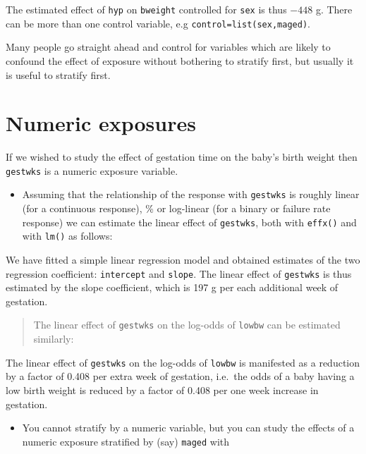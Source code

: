 \documentclass[
]{book}
\providecommand{\tightlist}{%
  \setlength{\itemsep}{0pt}\setlength{\parskip}{0pt}}
\begin{document}
The estimated effect of \texttt{hyp} on \texttt{bweight}
controlled for \texttt{sex} is thus \(-448\) g.
There can be more than one control variable, e.g
\texttt{control=list(sex,maged)}.

Many people go straight ahead and control for variables which are likely to confound the effect of exposure without bothering to stratify first, but usually it is useful to stratify first.

\section{Numeric exposures}\label{numeric-exposures}

If we wished to study the effect of gestation time on the baby's birth
weight then \texttt{gestwks} is a numeric exposure variable.

\begin{itemize}
\tightlist
\item
  Assuming that the relationship
  of the response with \texttt{gestwks} is roughly linear
  (for a continuous response),
  \% or log-linear (for a binary or failure rate response)
  we can estimate the linear effect of \texttt{gestwks},
  both with \texttt{effx()} and with \texttt{lm()} as follows:
\end{itemize}

We have fitted a simple linear regression model and
obtained estimates of the
two regression coefficient: \texttt{intercept} and \texttt{slope}.
The linear effect of \texttt{gestwks} is thus estimated by the
slope coefficient, which is 197 g per each additional week of gestation.

\begin{quote}
The linear effect of \texttt{gestwks} on the log-odds of \texttt{lowbw} can be estimated similarly:
\end{quote}

The linear effect of \texttt{gestwks} on the log-odds of \texttt{lowbw} is manifested as a reduction by a factor of 0.408 per extra week of gestation, i.e.~the odds of a baby having a low birth weight is reduced by a factor of 0.408 per one week increase in gestation.

\begin{itemize}
\tightlist
\item
  You cannot stratify by a numeric variable,
  but you can study the effects of a
  numeric exposure stratified by (say) \texttt{maged} with
\end{itemize}
\end{document}
